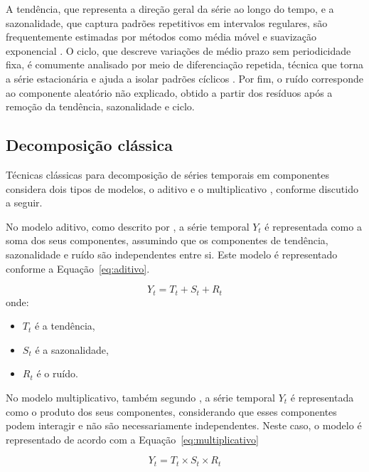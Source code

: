 A tendência, que representa a direção geral da série ao longo do tempo, e a sazonalidade, que captura padrões repetitivos em intervalos regulares, são frequentemente estimadas por métodos como média móvel e suavização exponencial \citep{brockwell2016}. O ciclo, que descreve variações de médio prazo sem periodicidade fixa, é comumente analisado por meio de diferenciação repetida, técnica que torna a série estacionária e ajuda a isolar padrões cíclicos \citep{box1976}. Por fim, o ruído corresponde ao componente aleatório não explicado, obtido a partir dos resíduos após a remoção da tendência, sazonalidade e ciclo.

\subsection{Decomposição clássica}

Técnicas clássicas para decomposição de séries temporais em componentes considera dois tipos de modelos, o aditivo e o multiplicativo \citep{bruni2007}, conforme discutido a seguir.

No modelo aditivo, como descrito por \cite{ratnadip2013}, a série temporal \( Y_t \) é representada como a soma dos seus componentes, assumindo que os componentes de tendência, sazonalidade e ruído são independentes entre si. Este modelo é representado conforme a Equação~\eqref{eq:aditivo}.

\begin{equation}
Y_t = T_t + S_t + R_t
\label{eq:aditivo}
\end{equation}
onde:
\begin{itemize}
    \item \( T_t \) é a tendência,
    \item \( S_t \) é a sazonalidade,
    \item \( R_t \) é o ruído.
\end{itemize}

No modelo multiplicativo, também segundo \cite{ratnadip2013}, a série temporal \( Y_t \) é representada como o produto dos seus componentes, considerando que esses componentes podem interagir e não são necessariamente independentes. Neste caso, o modelo é representado de acordo com a Equação~\eqref{eq:multiplicativo}

\begin{equation}
Y_t = T_t \times S_t \times R_t
\label{eq:multiplicativo}
\end{equation}



